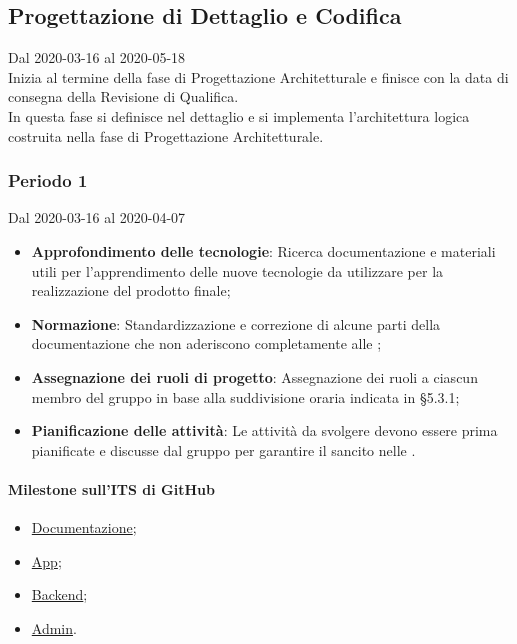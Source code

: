 \subsection{Progettazione di Dettaglio e Codifica}
Dal 2020-03-16 al 2020-05-18\\
Inizia al termine della fase di Progettazione Architetturale e finisce con la data di consegna della Revisione di Qualifica.\\
In questa fase si definisce nel dettaglio e si implementa l'architettura logica costruita nella fase di Progettazione Architetturale.

\subsubsection{Periodo 1} 
Dal 2020-03-16 al 2020-04-07
\begin{itemize}
	\item \textbf{Approfondimento delle tecnologie}: Ricerca documentazione e materiali utili per l'apprendimento delle nuove tecnologie da utilizzare per la realizzazione del prodotto finale;
	\item \textbf{Normazione}: Standardizzazione e correzione di alcune parti della documentazione che non aderiscono completamente alle \NdP{};
	\item \textbf{Assegnazione dei ruoli di progetto}: Assegnazione dei ruoli a ciascun membro del gruppo in base alla suddivisione oraria indicata in §5.3.1;
	\item \textbf{Pianificazione delle attività}: Le attività da svolgere devono essere prima pianificate e discusse dal gruppo per garantire il  sancito nelle \NdP{}.
\end{itemize}
\paragraph{Milestone sull'ITS di GitHub}
\begin{itemize}
	\item \href{https://github.com/qb-team/Stalker-Documentazione/milestone/11}{Documentazione};
	\item \href{https://github.com/qb-team/Stalker-App/milestone/1}{App};
	\item \href{https://github.com/qb-team/Stalker-Backend/milestone/1}{Backend};
	\item \href{https://github.com/qb-team/Stalker-Admin/milestone/1}{Admin}.
\end{itemize}

